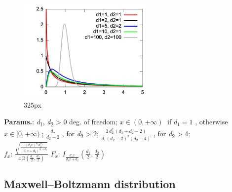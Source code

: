     \begin{figure}[H]
        \centering
        \includegraphics[width=0.6\textwidth]{images/F-distribution pdf.png}
        \caption{325px}
    \end{figure}




    {\color{darkblue} \textbf{Params.}:} {\textit{d}\textsubscript{1}, \textit{d}\textsubscript{2} > 0 deg. of freedom}; {$x \in (0, +\infty)\;$ if $d_1 = 1$ , otherwise $x \in [0, +\infty)\;$}; {$\frac{d_2}{d_2-2}\!$ ,  for \textit{d}\textsubscript{2} > 2}; {$\frac{2\,d_2^2\,(d_1+d_2-2)}{d_1 (d_2-2)^2 (d_2-4)}\!$ ,  for \textit{d}\textsubscript{2} > 4};\hspace{0.5cm}\\{\color{darkblue} \textbf{$f_x$}:} {$\frac{\sqrt{\frac{(d_1 x)^{d_1} d_2^{d_2}}{(d_1 x+d_2)^{d_1+d_2}}}}{x\,\mathrm{B}\!\left(\frac{d_1}{2},\frac{d_2}{2}\right)}\!$}{\color{darkblue} \textbf{$F_x$}:} {$I_{\frac{d_1 x}{d_1 x + d_2}} \left(\tfrac{d_1}{2}, \tfrac{d_2}{2} \right)$}



    
        
\subsection{Maxwell–Boltzmann distribution}


